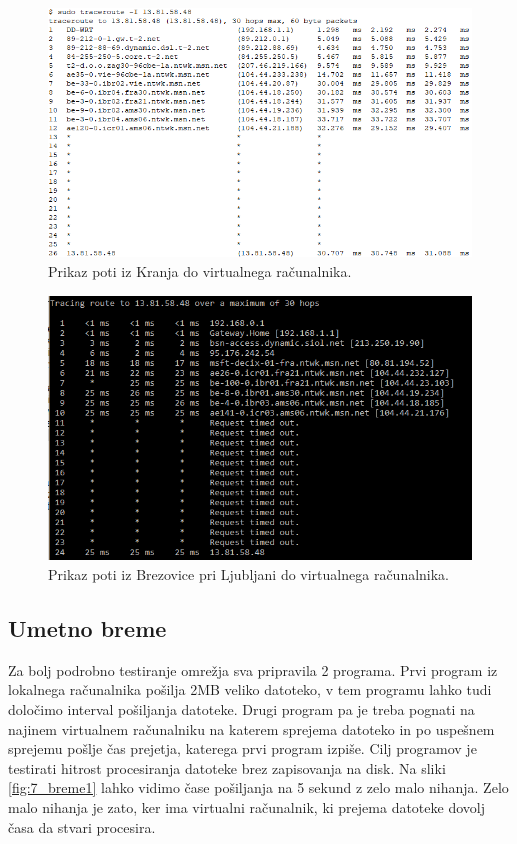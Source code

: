 \begin{figure}[H]
    \centering
    \includegraphics[scale=0.45]{Img/traceroute1.png}
    \caption{Prikaz poti iz Kranja do virtualnega računalnika.}
    \label{fig:6_traceroute1}
\end{figure}

\begin{figure}[H]
    \centering
    \includegraphics[scale=0.5]{Img/traceroute2.png}
    \caption{Prikaz poti iz Brezovice pri Ljubljani do virtualnega računalnika.}
    \label{fig:6_traceroute2}
\end{figure}


\subsection{Umetno breme}

Za bolj podrobno testiranje omrežja sva pripravila 2 programa. Prvi program iz lokalnega računalnika pošilja 2MB veliko datoteko, v tem programu lahko tudi določimo interval pošiljanja datoteke. Drugi program pa je treba pognati na najinem virtualnem računalniku na katerem sprejema datoteko in po uspešnem sprejemu pošlje čas prejetja, katerega prvi program izpiše.
Cilj programov je testirati hitrost procesiranja datoteke brez zapisovanja na disk.
Na sliki \ref{fig:7_breme1} lahko vidimo čase pošiljanja na 5 sekund z zelo malo nihanja. Zelo malo nihanja je zato, ker ima virtualni računalnik, ki prejema datoteke dovolj časa da stvari procesira. 

